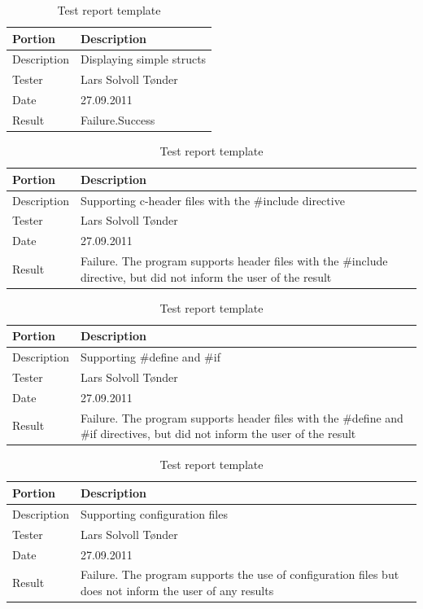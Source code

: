 \begin{table}[ht] \small \center
\caption{Test report template \label{tab:testreport}}
\begin{tabular}{l l}
	\toprule
	Portion & Description \\
	\midrule
	Description & Displaying simple structs \\
	Tester & Lars Solvoll Tønder \\
	Date & 27.09.2011 \\
	Result & Failure.Success\\
	\bottomrule
\end{tabular}
\end{table}

\begin{table}[ht] \small \center
\caption{Test report template \label{tab:testreport}}
\begin{tabular}{l l}
	\toprule
	Portion & Description \\
	\midrule
	Description &  Supporting c-header files with the \#include directive  \\
	Tester & Lars Solvoll Tønder \\
	Date & 27.09.2011 \\
	Result & Failure. The program supports header files with the \#include directive, but did not inform the user of the result\\
	\bottomrule
\end{tabular}
\end{table}

\begin{table}[ht] \small \center
\caption{Test report template \label{tab:testreport}}
\begin{tabular}{l l}
	\toprule
	Portion & Description \\
	\midrule
	Description &  Supporting \#define and \#if  \\
	Tester & Lars Solvoll Tønder \\
	Date & 27.09.2011 \\
	Result & Failure. The program supports header files with the \#define and \#if directives, but did not inform the user of the result\\
	\bottomrule
\end{tabular}
\end{table}

\begin{table}[ht] \small \center
\caption{Test report template \label{tab:testreport}}
\begin{tabular}{l l}
	\toprule
	Portion & Description \\
	\midrule
	Description &  Supporting configuration files  \\
	Tester & Lars Solvoll Tønder \\
	Date & 27.09.2011 \\
	Result & Failure. The program supports the use of configuration files but does not inform the user of any results\\
	\bottomrule
\end{tabular}
\end{table}


